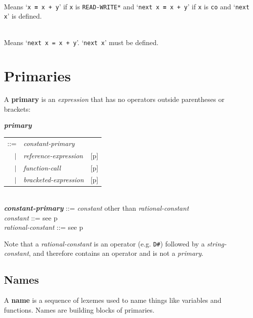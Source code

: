 \documentclass[12pt]{article}
\newcommand{\TT}[1]{{\tt \bfseries #1}}
\newcommand{\key}[1]{{\rm \bfseries #1}}
\newcommand{\emkey}[1]{{\em \bfseries #1}}
\newcommand{\pagref}[1]{p\pageref{#1}}
\newenvironment{indpar}[1][0.3in]%
	{\begin{list}{}%
		     {\setlength{\itemsep}{0in}%
		      \setlength{\topsep}{0in}%
		      \setlength{\parsep}{1ex}%
		      \setlength{\labelwidth}{#1}%
		      \setlength{\leftmargin}{#1}%
		      \addtolength{\leftmargin}{\labelsep}}%
	 \item}%
	{\end{list}}
\begin{document}
\begin{indpar}
\hspace*{-0.2in}{\tt x \TT{+=} y} \\
	Means `{\tt x \TT{=} x + y}' if {\tt x} is {\tt *READ-WRITE*}
	and `{\tt next x \TT{=} x + y}' if {\tt x} is {\tt co}
	and `{\tt next x}' is defined.

\hspace*{-0.2in}{\tt next x \TT{+=} y} \\
	Means `{\tt next x = x + y}'.  `{\tt next x}' must be defined.
\end{indpar}

\section{Primaries}
\label{PRIMARIES}

A \key{primary} is an {\em expression} that has no operators outside
parentheses or brackets:
\begin{indpar}
\emkey{primary}\label{PRIMARY}
    \begin{tabular}[t]{@{}rll}
    ::= & {\em constant-primary} \\
    $|$ & {\em reference-expression}    & [\pagref{REFERENCE-EXPRESSIONS}] \\
    $|$ & {\em function-call}		& [\pagref{FUNCTION-CALLS}] \\
    $|$ & {\em bracketed-expression}	& [\pagref{BRACKETED-EXPRESSIONS}] \\
    \end{tabular}
\\[0.5ex]
\emkey{constant-primary} ::= {\em constant} other than {\em rational-constant}
\\[0.5ex]
{\em constant} ::= see \pagref{CONSTANTS}
\\[0.5ex]
{\em rational-constant} ::= see \pagref{RATIONAL-CONSTANTS}

\end{indpar}

Note that a {\em rational-constant} is an operator (e.g. {\tt D\#})
followed by a {\em string-constant}, and therefore contains an operator
and is not a {\em primary}.

\subsection{Names}
\label{NAMES}

A \key{name} is a sequence of lexemes used to name things like
variables and functions.  Names are building blocks of primaries.
\end{document}
